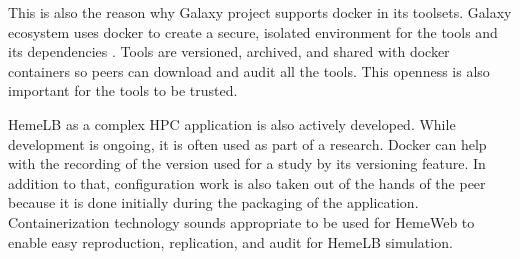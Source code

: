 This is also the reason why Galaxy project supports docker in its toolsets. Galaxy ecosystem uses docker to create a secure, isolated environment for the tools and its dependencies \citep{moreews2015curated}. Tools are versioned, archived, and shared with docker containers so peers can download and audit all the tools. This openness is also important for the tools to be trusted.

HemeLB as a complex HPC application is also actively developed. While development is ongoing, it is often used as part of a research. Docker can help with the recording of the version used for a study by its versioning feature. In addition to that, configuration work is also taken out of the hands of the peer because it is done initially during the packaging of the application. Containerization technology sounds appropriate to be used for HemeWeb to enable easy reproduction, replication, and audit for HemeLB simulation.






%
%
%

